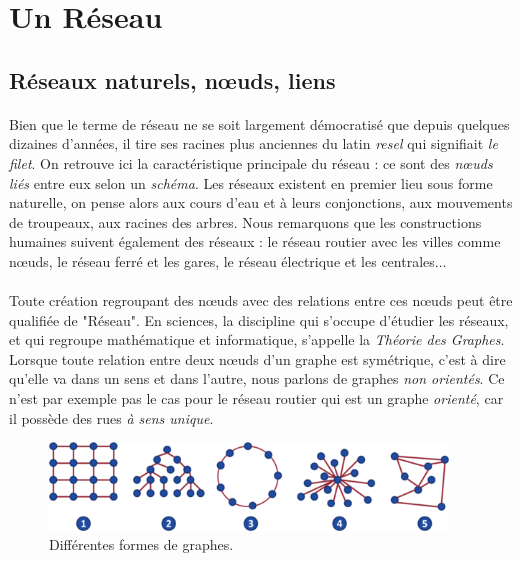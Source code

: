 \section{Un Réseau}

\subsection*{Réseaux naturels, n\oe{}uds, liens} \label{natural_networks}

\paragraph{} Bien que le terme de réseau ne se soit largement démocratisé que depuis quelques dizaines d'années, il tire ses
racines plus anciennes du latin \emph{resel} qui signifiait \emph{le filet}. On retrouve ici la caractéristique
principale du réseau : ce sont des \emph{n\oe{}uds liés} entre eux selon un \emph{schéma}. Les réseaux existent en
premier lieu sous forme naturelle, on pense alors aux cours d'eau et à leurs conjonctions, aux mouvements de troupeaux,
aux racines des arbres. Nous remarquons que les constructions humaines suivent également des réseaux : le réseau routier
avec les villes comme n\oe{}uds, le réseau ferré et les gares, le réseau électrique et les centrales...

\paragraph{} Toute création regroupant des n\oe{}uds avec des relations entre ces n\oe{}uds peut être qualifiée de "Réseau". En sciences,
la discipline qui s'occupe d'étudier les réseaux, et qui regroupe mathématique et informatique, s'appelle
la \emph{Théorie des Graphes}. Lorsque toute relation entre deux n\oe{}uds d'un graphe est symétrique, c'est à dire qu'elle va
dans un sens et dans l'autre, nous parlons de graphes \emph{non orientés}. Ce n'est par exemple pas le cas pour le
réseau routier qui est un graphe \emph{orienté}, car il possède des rues \emph{à sens unique}.

\begin{figure}[ht]
    \centering
    \includegraphics[width=400px]{chapters/02/images/reseaux.png}
    \caption{\label{network_graphs}Différentes formes de graphes.}
\end{figure}

